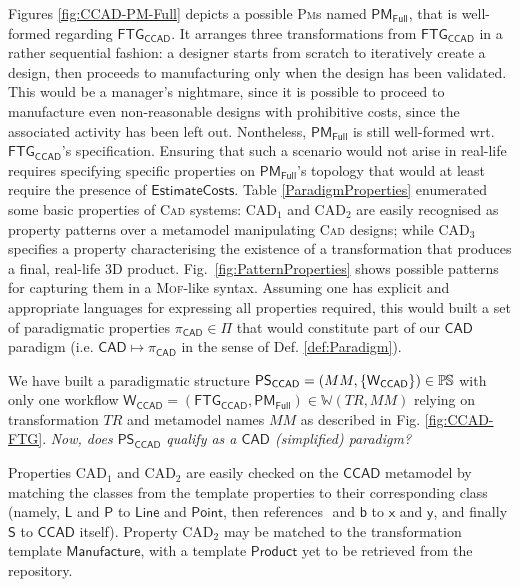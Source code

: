 Figures \ref{fig:CCAD-PM-Full} depicts a possible \textsc{Pm}s named
$\mathsf{PM_{Full}}$, that is well-formed regarding $\mathsf{FTG_{CCAD}}$.
It arranges three transformations from $\mathsf{FTG_{CCAD}}$ in a rather
sequential fashion: a designer starts from scratch to iteratively create a
design, then proceeds to manufacturing only when the design has been validated.
This would be a manager's nightmare, since it is possible to proceed to
manufacture even non-reasonable designs with prohibitive costs, since the
associated activity has been left out. Nontheless, $\mathsf{PM_{Full}}$ is still
well-formed wrt. $\mathsf{FTG_{CCAD}}$'s specification. Ensuring that such a
scenario would not arise in real-life requires specifying specific properties on
$\mathsf{PM_{Full}}$'s topology that would at least require the presence of
$\mathsf{EstimateCosts}$.
%
Table \ref{ParadigmProperties} enumerated some basic properties of \textsc{Cad} 
systems: $\mbox{CAD}_1$ and $\mbox{CAD}_2$ are easily recognised as property 
patterns over a metamodel manipulating \textsc{Cad} designs; while 
$\mbox{CAD}_3$ specifies a property characterising the existence of a 
transformation that produces a final, real-life 3D product. Fig.~\ref{fig:PatternProperties} 
shows possible patterns for capturing them in a 
\textsc{Mof}-like syntax. Assuming one has explicit and appropriate languages 
for expressing all properties required, this would built a set of 
paradigmatic properties $\pi_{\mathsf{CAD}}\in\Pi$ that would constitute part of 
our $\mathsf{CAD}$ paradigm (i.e. $\mathsf{CAD} \mapsto \pi_{\mathsf{CAD}}$ in 
the sense of Def. \ref{def:Paradigm}).


We have built a paradigmatic structure $\mathsf{PS_{CCAD}} = (MM, 
\{\mathsf{W_{CCAD}}\})\in\mathbb{P}\mskip-1mu\mathbb{S}$ with only one workflow $\mathsf{W_{CCAD}} = 
(\mathsf{FTG_{CCAD}}, \mathsf{PM_{Full}})\in\mathbb{W}(TR, MM)$ relying on 
transformation $TR$ and metamodel names $MM$ as described in Fig. 
\ref{fig:CCAD-FTG}. \emph{Now, does $\mathsf{PS_{CCAD}}$ qualify as a 
$\mathsf{CAD}$ (simplified) paradigm?}

Properties $\mbox{CAD}_1$ and $\mbox{CAD}_2$ are easily checked on the 
$\mathsf{CCAD}$ metamodel by matching the classes from the template properties 
to their corresponding class (namely, $\mathsf{L}$ and $\mathsf{P}$ to 
$\mathsf{Line}$ and $\mathsf{Point}$, then references $\mathsf{}$ and 
$\mathsf{b}$ to $\mathsf{x}$ and $\mathsf{y}$, and finally $\mathsf{S}$ to 
$\mathsf{CCAD}$ itself). Property $\mbox{CAD}_2$ may be matched to the 
transformation template $\mathsf{Manufacture}$, with a template 
$\mathsf{Product}$ yet to be retrieved from the repository.  

